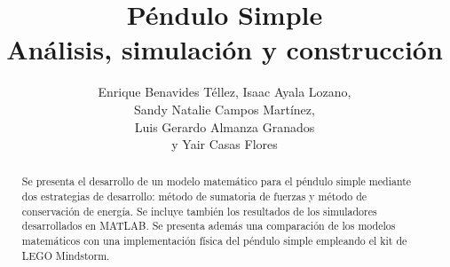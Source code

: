 \documentclass[letterpaper, 12pt]{article}
\begin{document}
\title{
Péndulo Simple\\
Análisis, simulación y construcción\\
}


\author{
    Enrique Benavides Téllez, Isaac Ayala Lozano,\\ 
    Sandy Natalie Campos Martínez,\\
    Luis Gerardo Almanza Granados\\
    y Yair Casas Flores
}

\date{}

\maketitle

\begin{abstract}



Se presenta el desarrollo de un modelo matemático
para el péndulo simple mediante dos estrategias de desarrollo:
método de sumatoria de fuerzas y método de conservación de energía.
Se incluye también los resultados de los simuladores desarrollados 
en MATLAB.
Se presenta además una comparación de los modelos matemáticos 
con una implementación física del péndulo simple empleando el 
kit de LEGO Mindstorm.

\end{abstract}












\clearpage
% 
\printbibliography{}
\end{document}
